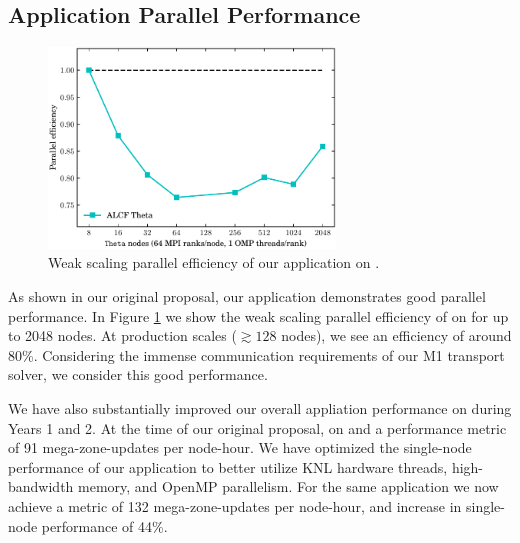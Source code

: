 \documentclass[12pt]{article}
\begin{document}
    



\subsection{Application Parallel Performance}

\begin{figure}
    \includegraphics[width=3in]{wkScaleSparkAll.pdf} 
    \caption{Weak scaling parallel efficiency of our \sparkmone application on \thet.}   
    \label{f.wkScaleThet}
\end{figure}

As shown in our original proposal, our application demonstrates good parallel performance. 
In Figure \ref{f.wkScaleThet} we show the weak scaling parallel efficiency of \sparkmone on \thet for up to 2048 nodes. 
At production scales ($\gtrsim128$ nodes), we see an efficiency of around 80\%. 
Considering the immense communication requirements of our M1 transport solver, we consider this good performance. 

We have also substantially improved our overall appliation performance on \thet during Years 1 and 2. 
At the time of our original proposal, \sparkmone on \thet and a performance metric of 91 mega-zone-updates per node-hour. 
We have optimized the single-node performance of our application to better utilize KNL hardware threads, high-bandwidth memory, and OpenMP parallelism. 
For the same application we now achieve a metric of 132 mega-zone-updates per node-hour, and increase in single-node performance of 44\%. 
\end{document}
